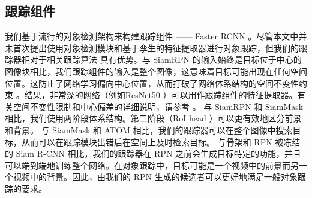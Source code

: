 \subsection{跟踪组件}

我们基于流行的对象检测架构来构建跟踪组件 —— Faster RCNN \cite{ren2015faster}。尽管本文中并未首次提出使用对象检测模块和基于孪生的特征提取器进行对象跟踪，但我们的跟踪器相对于相关跟踪算法 \cite{SiamRPN, Wang2018SiamMask, danelljan2019atom, voigtlaender2019siam} 具有优势。与 SiamRPN \cite{SiamRPN}的输入始终是目标位于中心的图像块相比，我们跟踪组件的输入是整个图像，这意味着目标可能出现在任何空间位置。这防止了网络学习偏向中心位置，从而打破了网络体系结构的空间不变性约束 \cite{SiamRPN++}。结果，非常深的网络（例如ResNet50 \cite{he2016deep}）可以用作跟踪组件的特征提取器。有关空间不变性限制和中心偏差的详细说明，请参考 \cite{SiamRPN++}。
与 SiamRPN \cite{SiamRPN} 和 SiamMask \cite{Wang2018SiamMask} 相比，我们使用两阶段体系结构。第二阶段（RoI head \cite{ren2015faster}）可以更有效地区分前景和背景。
与 SiamMask \cite{Wang2018SiamMask} 和 ATOM \cite{danelljan2019atom}相比，我们的跟踪器可以在整个图像中搜索目标，从而可以在跟踪模块出错后在空间上及时检索目标。
与骨架和 RPN 被冻结的 Siam R-CNN \cite{voigtlaender2019siam} 相比，我们的跟踪器在 RPN 之前会生成目标特定的功能，并且可以端到端地训练整个网络。在对象跟踪中，目标可能是一个视频中的前景而另一个视频中的背景。因此，由我们的 RPN 生成的候选者可以更好地满足一般对象跟踪的要求。

